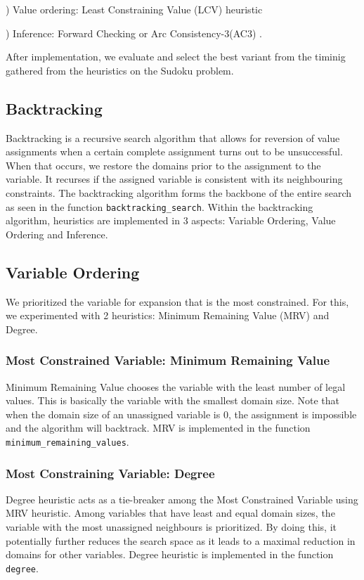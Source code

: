 \documentclass[runningheads]{llncs}
\begin{document}
\indent {}) Value ordering: Least Constraining Value (LCV) heuristic 

\indent {}) Inference: Forward Checking or Arc Consistency-3(AC3) .  

After implementation, we evaluate and select the best variant from the timinig gathered from the \indent heuristics on the Sudoku problem. 

\subsection{Backtracking}

Backtracking is a recursive search algorithm that allows for reversion of value assignments when a certain complete assignment turns out to be unsuccessful. When that occurs, we restore the domains prior to the assignment to the variable. It recurses if the assigned variable is consistent with its neighbouring constraints.  The backtracking algorithm forms the backbone of the entire search as seen in the function \verb`backtracking_search`. Within the backtracking algorithm, heuristics are implemented in 3 aspects: Variable Ordering, Value Ordering and Inference.

\subsection{Variable Ordering}
We prioritized the variable for expansion that is the most constrained. For this, we experimented with 2 heuristics: Minimum Remaining Value (MRV) and Degree.

\subsubsection{Most Constrained Variable: Minimum Remaining Value}

Minimum Remaining Value chooses the variable with the least number of legal values. This is basically the variable with the smallest domain size. Note that when the domain size of an unassigned variable is 0, the assignment is impossible and the algorithm will backtrack. MRV is implemented in the function \verb`minimum_remaining_values`.

\subsubsection{Most Constraining Variable: Degree}
Degree heuristic acts as a tie-breaker among the Most Constrained Variable using MRV heuristic. Among variables that have least and equal domain sizes, the variable with the most unassigned neighbours is prioritized. By doing this, it potentially further reduces the search space as it leads to a maximal reduction in domains for other variables. Degree heuristic is implemented in the function \verb`degree`. 
\end{document}

